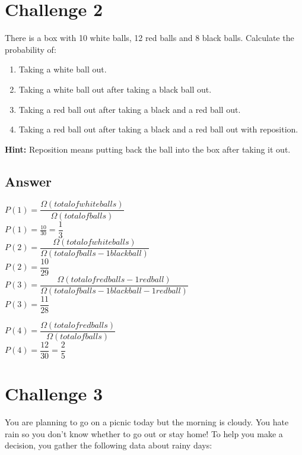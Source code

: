 \documentclass[a4paper]{article} %
\begin{document}
\bigskip


\section{Challenge 2}
There is a box with 10 white balls, 12 red balls and 8 black balls. Calculate the probability of:
\begin{enumerate}
    \item Taking a white ball out.
    \item Taking a white ball out after taking a black ball out.
    \item Taking a red ball out after taking a black and a red ball out.
    \item Taking a red ball out after taking a black and a red ball out with reposition.
\end{enumerate}
\textbf{Hint:} Reposition means putting back the ball into the box after taking it out.

\subsection*{Answer}
$P(1) = \dfrac{\Omega(total of white balls)}{\Omega(total of balls)}$ \\
$P(1) = \frac{10}{30} = \dfrac{1}{3}$\\

$P(2) = \dfrac{\Omega(total of white balls)}{\Omega(total of balls-1 black ball)}$ \\
$P(2) = \dfrac{10}{29}$\\

$P(3) = \dfrac{\Omega(total of red balls - 1 red ball)}{\Omega(total of balls-1 black ball- 1 red ball)}$ \\
$P(3) = \dfrac{11}{28}$

$P(4) = \dfrac{\Omega(total of red balls)}{\Omega(total of balls)}$ \\
$P(4) = \dfrac{12}{30} = \dfrac{2}{5}$

\bigskip

\section{Challenge 3}
You are planning to go on a picnic today but the morning is cloudy. You hate rain so you don't know whether to go out or stay home! To help you make a decision, you gather the following data about rainy days:
\end{document}
